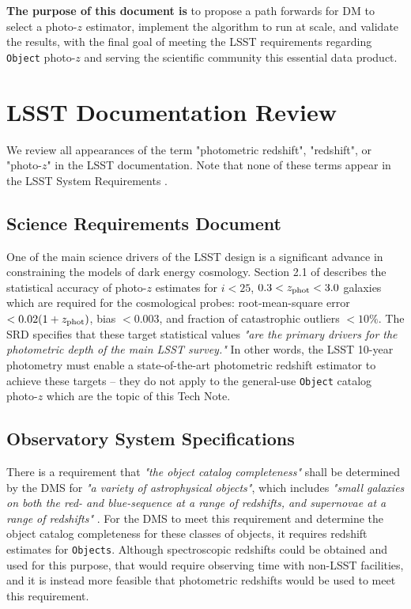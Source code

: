 \documentclass[DM,lsstdraft,toc]{lsstdoc}
\begin{document}
{\bf The purpose of this document is} to propose a path forwards for DM to select a photo-$z$ estimator, implement the algorithm to run at scale, and validate the results, with the final goal of meeting the LSST requirements regarding {\tt Object} photo-$z$ and serving the scientific community this essential data product.




\clearpage
\section{LSST Documentation Review}\label{sec:docs}

We review all appearances of the term "photometric redshift", "redshift", or "photo-$z$" in the LSST documentation. Note that none of these terms appear in the LSST System Requirements .

\subsection{Science Requirements Document}\label{ssec:docs_srd}

One of the main science drivers of the LSST design is a significant advance in constraining the models of dark energy cosmology. 
Section 2.1 of  describes the statistical accuracy of photo-$z$ estimates for $i<25$, $0.3<z_{\rm phot}<3.0$ galaxies which are required for the cosmological probes: root-mean-square error $<0.02(1+z_{\rm phot})$, bias $<0.003$, and fraction of catastrophic outliers $<10\%$.
The SRD specifies that these target statistical values {\it "are the primary drivers for the photometric depth of the main LSST survey."} 
In other words, the LSST 10-year photometry must enable a state-of-the-art photometric redshift estimator to achieve these targets -- they do not apply to the general-use {\tt Object} catalog photo-$z$ which are the topic of this Tech Note.

\subsection{Observatory System Specifications}\label{ssec:docs_oss}

There is a requirement that {\it "the object catalog completeness"} shall be determined by the DMS for {\it "a variety of astrophysical objects"}, which includes {\it "small galaxies on both the red- and blue-sequence at a range of redshifts, and supernovae at a range of redshifts"} . 
For the DMS to meet this requirement and determine the object catalog completeness for these classes of objects, it requires redshift estimates for {\tt Objects}.
Although spectroscopic redshifts could be obtained and used for this purpose, that would require observing time with non-LSST facilities, and it is instead more feasible that photometric redshifts would be used to meet this requirement.
\end{document}
